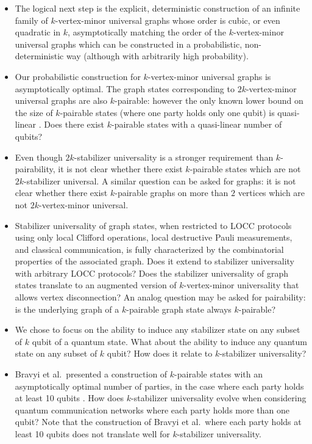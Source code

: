 \documentclass[a4paper,UKenglish,cleveref, autoref, thm-restate]{arxiv}
\begin{document}
 \begin{itemize}
    \item The logical next step is the explicit, deterministic construction of an infinite family of $k$-vertex-minor universal graphs whose order is cubic, or even quadratic in $k$, asymptotically matching the order of the $k$-vertex-minor universal graphs which can be constructed in a probabilistic, non-deterministic way (although with arbitrarily high probability).
     \item Our probabilistic construction for $k$-vertex-minor universal graphs is asymptotically optimal. The graph states corresponding to $2k$-vertex-minor universal graphs are also $k$-pairable: however the only known lower bound on the size of $k$-pairable states (where one party holds only one qubit) is quasi-linear \cite{bravyi2022generating}. Does there exist $k$-pairable states with a quasi-linear number of qubits? 
     \item Even though $2k$-stabilizer universality is a stronger requirement than $k$-pairability, it is not clear whether there exist $k$-pairable states which are not $2k$-stabilizer universal. A similar question can be asked for graphs: it is not clear whether there exist $k$-pairable graphs on more than $2$ vertices which are not $2k$-vertex-minor universal.
     \item Stabilizer universality of graph states, when restricted to LOCC protocols using only local Clifford operations, local destructive Pauli measurements, and classical communication, is fully characterized by the combinatorial properties of the associated graph. Does it extend to stabilizer universality with arbitrary LOCC protocols? Does the stabilizer universality of graph states translate to an augmented version of $k$-vertex-minor universality that allows vertex disconnection? An analog question may be asked for pairability: is the underlying graph of a $k$-pairable graph state always $k$-pairable?
     \item We chose to focus on the ability to induce any stabilizer state on any subset of $k$ qubit of a quantum state. What about the ability to induce any quantum state on any subset of $k$ qubit? How does it relate to $k$-stabilizer universality?
     \item Bravyi et al.~presented a construction of $k$-pairable states with an asymptotically optimal number of parties, in the case where each party holds at least 10 qubits \cite{bravyi2022generating}. How does $k$-stabilizer universality evolve when considering quantum communication networks where each party holds more than one qubit? Note that the construction of Bravyi et al.~where each party holds at least 10 qubits does not translate well for $k$-stabilizer universality.
 \end{itemize}
\end{document}
